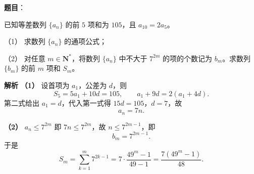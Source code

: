 \begin{answer}

\textbf{题目}：

已知等差数列 $\{a_n\}$ 的前 $5$ 项和为 $105$，且 $a_{10}=2a_5$。

（1） 求数列 $\{a_n\}$ 的通项公式；

（2） 对任意 $m\in\mathbf N^*$，将数列 $\{a_n\}$ 中不大于 $7^{2m}$ 的项的个数记为 $b_m$。求数列 $\{b_m\}$ 的前 $m$ 项和 $S_m$。

\textbf{解析}
\textbf{（1）} 设首项为 $a_1$，公差为 $d$，则
\nopagebreak[4]
\[S_5=5a_1+10d=105,\qquad a_1+9d=2(a_1+4d).\]
第二式给出 $a_1=d$，代入第一式得 $15d=105$，$d=7$，故
\nopagebreak[4]
\[a_n=7n.\]

\textbf{（2）} $a_n\leqslant7^{2m}$ 即 $7n\leqslant7^{2m}$，故 $n\leqslant7^{2m-1}$，即
\nopagebreak[4]
\[b_m=7^{2m-1}.\]
于是
\nopagebreak[4]
\[S_m=\sum_{k=1}^m7^{2k-1}=7\cdot\frac{49^m-1}{49-1}=\frac{7(49^m-1)}{48}.\]



\end{answer}

